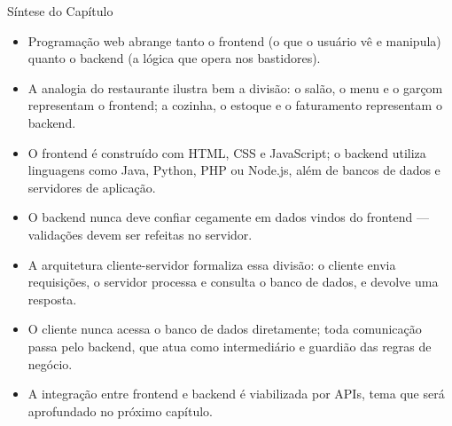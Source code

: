 Síntese do Capítulo

\begin{itemize}
  \item Programação web abrange tanto o frontend (o que o usuário vê e manipula) quanto o backend (a lógica que opera nos bastidores).
\end{itemize}

\begin{itemize}
  \item A analogia do restaurante ilustra bem a divisão: o salão, o menu e o garçom representam o frontend; a cozinha, o estoque e o faturamento representam o backend.
\end{itemize}

\begin{itemize}
  \item O frontend é construído com HTML, CSS e JavaScript; o backend utiliza linguagens como Java, Python, PHP ou Node.js, além de bancos de dados e servidores de aplicação.
\end{itemize}

\begin{itemize}
  \item O backend nunca deve confiar cegamente em dados vindos do frontend — validações devem ser refeitas no servidor.
\end{itemize}

\begin{itemize}
  \item A arquitetura cliente-servidor formaliza essa divisão: o cliente envia requisições, o servidor processa e consulta o banco de dados, e devolve uma resposta.
\end{itemize}

\begin{itemize}
  \item O cliente nunca acessa o banco de dados diretamente; toda comunicação passa pelo backend, que atua como intermediário e guardião das regras de negócio.
\end{itemize}

\begin{itemize}
  \item A integração entre frontend e backend é viabilizada por APIs, tema que será aprofundado no próximo capítulo.
\end{itemize}

